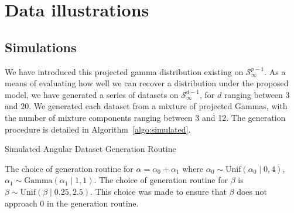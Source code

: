 
\section{Data illustrations\label{sec:results}}

\subsection{Simulations\label{subsec:simulated}}
We have introduced this projected gamma distribution existing on $\mathcal{S}_{\infty}^{p-1}$.  As a
  means of evaluating how well we can recover a distribution under the proposed model, we have
  generated a series of datasets on $\mathcal{S}_{\infty}^{d-1}$, for $d$ ranging between 3 and 20.
  We generated each dataset from a mixture of projected Gammas, with the number of mixture components
  ranging between 3 and 12.  The generation procedure is detailed in Algorithm~\ref{algo:simulated}.
  \begin{algorithm}[ht]
    \caption{Simulated Angular Dataset Generation Routine\label{algo:simulated}}
  \end{algorithm}
  The choice of generation routine for $\alpha = \alpha_0 + \alpha_1$ where
  $\alpha_0 \sim \text{Unif}(\alpha_0\mid 0,4)$, $\alpha_1\sim \text{Gamma}(\alpha_1\mid 1,1)$.
  The choice of generation routine for $\beta$ is $\beta\sim\text{Unif}(\beta\mid 0.25, 2.5)$.
  This choice was made to ensure that $\beta$ does not approach 0 in the generation routine.


